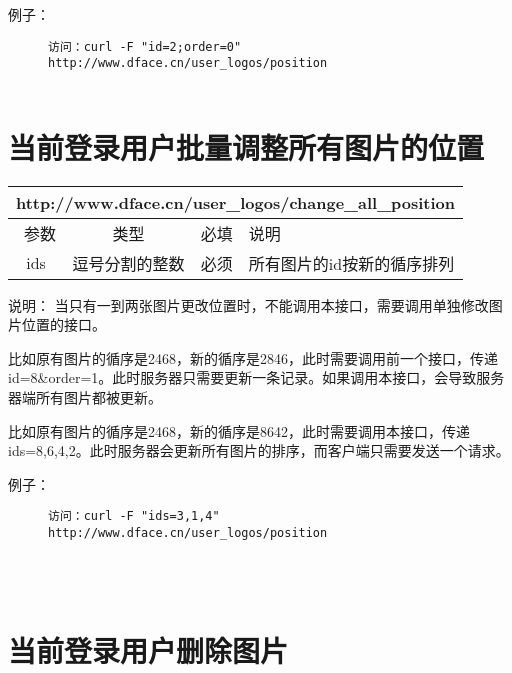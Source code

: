 \documentclass[cs4size]{ctexartutf8}
\begin{document}
例子：

\begin{figure}[H]
\begin{verbatim}
访问：curl -F "id=2;order=0" 
http://www.dface.cn/user_logos/position


\end{verbatim}
\end{figure}


\section{当前登录用户批量调整所有图片的位置}

\begin{table}[H]
   \begin{center}
\begin{tabular}{|c|c|c|p{12cm}|}
\hline
\multicolumn{4}{|c|}{http://www.dface.cn/user\_logos/change\_all\_position} \\
\hline\hline
 \  参数  & 类型 & 必填 &  说明  \\
\hline
 ids  & 逗号分割的整数 & 必须 &  所有图片的id按新的循序排列\\
\hline
\end{tabular}
   \end{center}
\end{table}

说明：
当只有一到两张图片更改位置时，不能调用本接口，需要调用单独修改图片位置的接口。

比如原有图片的循序是2468，新的循序是2846，此时需要调用前一个接口，传递id=8\&order=1。此时服务器只需要更新一条记录。如果调用本接口，会导致服务器端所有图片都被更新。

比如原有图片的循序是2468，新的循序是8642，此时需要调用本接口，传递ids=8,6,4,2。此时服务器会更新所有图片的排序，而客户端只需要发送一个请求。

例子：

\begin{figure}[H]
\begin{verbatim}
访问：curl -F "ids=3,1,4" 
http://www.dface.cn/user_logos/position




\end{verbatim}
\end{figure}



\section{当前登录用户删除图片}
\end{document}
